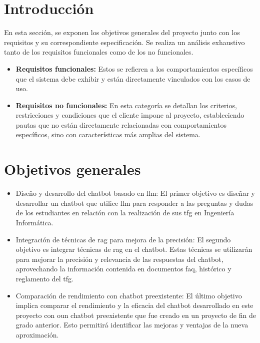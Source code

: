 \newpage
{}

\section{Introducción}

En esta sección, se exponen los objetivos generales del proyecto junto con los requisitos y su correspondiente especificación. Se realiza un análisis exhaustivo tanto de los requisitos funcionales como de los no funcionales.

\begin{itemize}

\item \textbf{Requisitos funcionales:} Estos se refieren a los comportamientos específicos que el sistema debe exhibir y están directamente vinculados con los casos de uso.

\item \textbf{Requisitos no funcionales:} En esta categoría se detallan los criterios, restricciones y condiciones que el cliente impone al proyecto, estableciendo pautas que no están directamente relacionadas con comportamientos específicos, sino con características más amplias del sistema.
\end{itemize}

\section{Objetivos generales}

\begin{itemize}

\item Diseño y desarrollo del chatbot basado en \acrshort{llm}: El primer objetivo es diseñar y desarrollar un chatbot que utilice \acrlong{llm} para responder a las preguntas y dudas de los estudiantes en relación con la realización de sus \acrlong{tfg} en Ingeniería Informática.
    
\item Integración de técnicas de \acrshort{rag} para mejora de la precisión: El segundo objetivo es integrar técnicas de \acrlong{rag} en el chatbot. Estas técnicas se utilizarán para mejorar la precisión y relevancia de las respuestas del chatbot, aprovechando la información contenida en documentos \acrshort{faq}, histórico y reglamento del \acrshort{tfg}.

\item Comparación de rendimiento con chatbot preexistente: El último objetivo implica comparar el rendimiento y la eficacia del chatbot desarrollado en este proyecto con oun chatbot preexistente que fue creado en un proyecto de fin de grado anterior. Esto permitirá identificar las mejoras y ventajas de la nueva aproximación.

\end{itemize}

